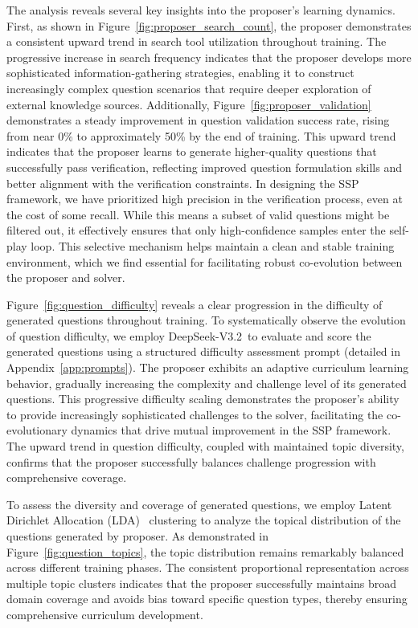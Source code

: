 \documentclass[10pt, a4paper, logo]{googledeepmind} %
\begin{document}
The analysis reveals several key insights into the proposer's learning dynamics. First, as shown in Figure~\ref{fig:proposer_search_count}, the proposer demonstrates a consistent upward trend in search tool utilization throughout training. The progressive increase in search frequency indicates that the proposer develops more sophisticated information-gathering strategies, enabling it to construct increasingly complex question scenarios that require deeper exploration of external knowledge sources. Additionally, Figure~\ref{fig:proposer_validation} demonstrates a steady improvement in question validation success rate, rising from near 0\% to approximately 50\% by the end of training. This upward trend indicates that the proposer learns to generate higher-quality questions that successfully pass verification, reflecting improved question formulation skills and better alignment with the verification constraints. In designing the SSP framework, we have prioritized high precision in the verification process, even at the cost of some recall. While this means a subset of valid questions might be filtered out, it effectively ensures that only high-confidence samples enter the self-play loop. This selective mechanism helps maintain a clean and stable training environment, which we find essential for facilitating robust co-evolution between the proposer and solver.

Figure~\ref{fig:question_difficulty} reveals a clear progression in the difficulty of generated questions throughout training. To systematically observe the evolution of question difficulty, we employ DeepSeek-V3.2~\citep{liu2024deepseek}to evaluate and score the generated questions using a structured difficulty assessment prompt (detailed in Appendix~\ref{app:prompts}). The proposer exhibits an adaptive curriculum learning behavior, gradually increasing the complexity and challenge level of its generated questions. This progressive difficulty scaling demonstrates the proposer's ability to provide increasingly sophisticated challenges to the solver, facilitating the co-evolutionary dynamics that drive mutual improvement in the SSP framework. The upward trend in question difficulty, coupled with maintained topic diversity, confirms that the proposer successfully balances challenge progression with comprehensive coverage.

To assess the diversity and coverage of generated questions, we employ Latent Dirichlet Allocation (LDA)~\citep{blei2003latent} clustering to analyze the topical distribution of the questions generated by proposer. As demonstrated in Figure~\ref{fig:question_topics}, the topic distribution remains remarkably balanced across different training phases. The consistent proportional representation across multiple topic clusters indicates that the proposer successfully maintains broad domain coverage and avoids bias toward specific question types, thereby ensuring comprehensive curriculum development.
\end{document}
